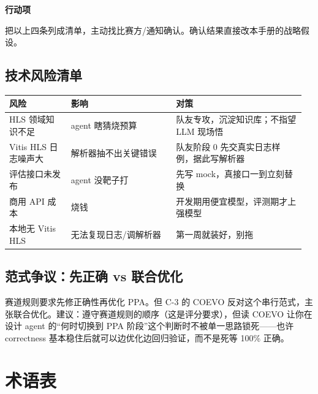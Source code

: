 \documentclass[12pt,a4paper]{ctexbook}
\begin{document}
\begin{warnbox}
\textbf{行动项}\par
把以上四条列成清单，主动找比赛方/通知确认。确认结果直接改本手册的战略假设。
\end{warnbox}

\section{技术风险清单}

\begin{longtable}{@{}p{0.20\linewidth}p{0.34\linewidth}p{0.42\linewidth}@{}}
\toprule
\textbf{风险} & \textbf{影响} & \textbf{对策} \\
\midrule
\endhead
HLS 领域知识不足 & agent 瞎猜烧预算 & 队友专攻，沉淀知识库；不指望 LLM 现场悟 \\
Vitis HLS 日志噪声大 & 解析器抽不出关键错误 & 队友阶段 0 先交真实日志样例，据此写解析器 \\
评估接口未发布 & agent 没靶子打 & 先写 mock，真接口一到立刻替换 \\
商用 API 成本 & 烧钱 & 开发期用便宜模型，评测期才上强模型 \\
本地无 Vitis HLS & 无法复现日志/调解析器 & 第一周就装好，别拖 \\
\bottomrule
\end{longtable}

\section{范式争议：先正确 vs 联合优化}

赛道规则要求先修正确性再优化 PPA。但 C-3 的 COEVO 反对这个串行范式，主张联合优化。建议：遵守赛道规则的顺序（这是评分要求），但读 COEVO 让你在设计 agent 的“何时切换到 PPA 阶段”这个判断时不被单一思路锁死——也许 correctness 基本稳住后就可以边优化边回归验证，而不是死等 100\% 正确。

\appendix
\chapter{术语表}
\end{document}
